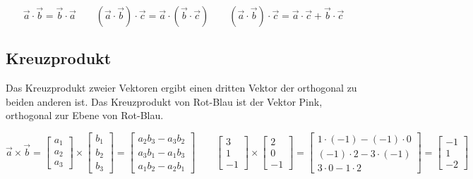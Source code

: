 \begin{equation*}
    \vec{a} \cdot \vec{b} = \vec{b} \cdot \vec{a}
    \qquad (\vec{a} \cdot \vec{b}) \cdot \vec{c} = \vec{a} \cdot (\vec{b} \cdot \vec{c})
    \qquad (\vec{a} \cdot \vec{b}) \cdot \vec{c}  = \vec{a} \cdot \vec{c} + \vec{b} \cdot \vec{c} 
\end{equation*}

\subsection{Kreuzprodukt}

Das Kreuzprodukt zweier Vektoren ergibt einen dritten Vektor der orthogonal
zu beiden anderen ist. Das Kreuzprodukt von Rot-Blau ist der Vektor Pink, orthogonal zur
Ebene von Rot-Blau.

\begin{equation*}
    \vec{a} \times \vec{b} =
    \begin{bmatrix}
        a_1 \\
        a_2 \\
        a_3
    \end{bmatrix} \times
    \begin{bmatrix}
        b_1 \\
        b_2 \\
        b_3
    \end{bmatrix} =
    \begin{bmatrix}
        a_2 b_3 - a_3 b_2 \\
        a_3 b_1 - a_1 b_3 \\
        a_1 b_2 - a_2 b_1
    \end{bmatrix}
    \qquad
    \begin{bmatrix}
        3 \\
        1 \\
        -1
    \end{bmatrix} \times
    \begin{bmatrix}
        2 \\
        0 \\
        -1
    \end{bmatrix} =
    \begin{bmatrix}
        1 \cdot (-1) - (-1) \cdot 0 \\
        (-1) \cdot 2 - 3 \cdot (-1) \\
        3 \cdot 0 - 1 \cdot 2
    \end{bmatrix} =
    \begin{bmatrix}
        -1 \\
        1 \\
        -2
    \end{bmatrix}
\end{equation*}

